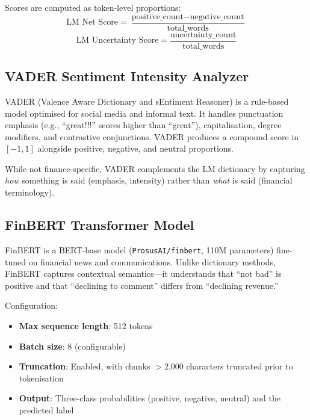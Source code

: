 \documentclass[12pt,a4paper]{article}
\begin{document}
Scores are computed as token-level proportions:
\begin{equation}
    \text{LM Net Score} = \frac{\text{positive\_count} - \text{negative\_count}}{\text{total\_words}}
    \label{eq:lm-score}
\end{equation}
\begin{equation}
    \text{LM Uncertainty Score} = \frac{\text{uncertainty\_count}}{\text{total\_words}}
    \label{eq:lm-uncertainty}
\end{equation}

\subsection{VADER Sentiment Intensity Analyzer}

VADER (Valence Aware Dictionary and sEntiment Reasoner) \citep{hutto2014vader} is a rule-based model optimised for social media and informal text. It handles punctuation emphasis (e.g., ``great!!!'' scores higher than ``great''), capitalisation, degree modifiers, and contrastive conjunctions. VADER produces a compound score in $[-1, 1]$ alongside positive, negative, and neutral proportions.

While not finance-specific, VADER complements the LM dictionary by capturing \emph{how} something is said (emphasis, intensity) rather than \emph{what} is said (financial terminology).

\subsection{FinBERT Transformer Model}

FinBERT \citep{araci2019finbert} is a BERT-base model (\texttt{ProsusAI/finbert}, 110M parameters) fine-tuned on financial news and communications. Unlike dictionary methods, FinBERT captures contextual semantics---it understands that ``not bad'' is positive and that ``declining to comment'' differs from ``declining revenue.''

Configuration:
\begin{itemize}[noitemsep]
    \item \textbf{Max sequence length}: 512 tokens
    \item \textbf{Batch size}: 8 (configurable)
    \item \textbf{Truncation}: Enabled, with chunks $>$2,000 characters truncated prior to tokenisation
    \item \textbf{Output}: Three-class probabilities (positive, negative, neutral) and the predicted label
\end{itemize}
\end{document}
